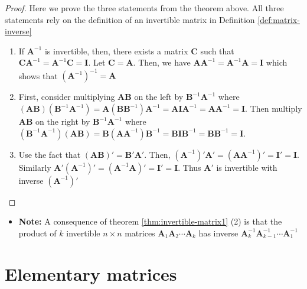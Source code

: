 \documentclass[
]{book}
\providecommand{\tightlist}{%
  \setlength{\itemsep}{0pt}\setlength{\parskip}{0pt}}
\theoremstyle{definition}
\theoremstyle{definition}
\theoremstyle{definition}
\theoremstyle{definition}
\theoremstyle{remark}
\begin{document}
\begin{proof}

Here we prove the three statements from the theorem above. All three statements rely on the definition of an invertible matrix in Definition \ref{def:matrix-inverse}

\begin{enumerate}
\def\labelenumi{\arabic{enumi})}
\item
  If \(\mathbf{A}^{-1}\) is invertible, then, there exists a matrix \(\mathbf{C}\) such that \(\mathbf{C} \mathbf{A}^{-1} = \mathbf{A}^{-1} \mathbf{C} = \mathbf{I}\). Let \(\mathbf{C} = \mathbf{A}\). Then, we have \(\mathbf{A} \mathbf{A}^{-1} = \mathbf{A}^{-1} \mathbf{A} = \mathbf{I}\) which shows that \(\left(\mathbf{A}^{-1}\right)^{-1} = \mathbf{A}\)
\item
  First, consider multiplying \(\mathbf{A}\mathbf{B}\) on the left by \(\mathbf{B}^{-1} \mathbf{A}^{-1}\) where \((\mathbf{A}\mathbf{B}) (\mathbf{B}^{-1} \mathbf{A}^{-1}) = \mathbf{A} (\mathbf{B} \mathbf{B}^{-1}) \mathbf{A}^{-1} = \mathbf{A} \mathbf{I} \mathbf{A}^{-1} = \mathbf{A} \mathbf{A}^{-1} = \mathbf{I}\). Then multiply \(\mathbf{A}\mathbf{B}\) on the right by \(\mathbf{B}^{-1} \mathbf{A}^{-1}\) where \((\mathbf{B}^{-1} \mathbf{A}^{-1}) (\mathbf{A}\mathbf{B}) = \mathbf{B} (\mathbf{A} \mathbf{A}^{-1}) \mathbf{B}^{-1} = \mathbf{B} \mathbf{I} \mathbf{B}^{-1} = \mathbf{B} \mathbf{B}^{-1} = \mathbf{I}\).
\item
  Use the fact that \((\mathbf{A} \mathbf{B})' = \mathbf{B}' \mathbf{A}'\). Then, \((\mathbf{A}^{-1})' \mathbf{A}' = (\mathbf{A}\mathbf{A}^{-1})' = \mathbf{I}' = \mathbf{I}\). Similarly \(\mathbf{A}'(\mathbf{A}^{-1})' = (\mathbf{A}^{-1}\mathbf{A})' = \mathbf{I}' = \mathbf{I}\). Thus \(\mathbf{A}'\) is invertible with inverse \((\mathbf{A}^{-1})'\)
\end{enumerate}

\end{proof}

\begin{itemize}
\tightlist
\item
  \textbf{Note:} A consequence of theorem \ref{thm:invertible-matrix1} (2) is that the product of \(k\) invertible \(n \times n\) matrices \(\mathbf{A}_1 \mathbf{A}_2 \cdots \mathbf{A}_k\) has inverse \(\mathbf{A}_k^{-1} \mathbf{A}_{k-1}^{-1} \cdots \mathbf{A}_1^{-1}\)
\end{itemize}

\hypertarget{elementary-matrices}{%
\section{Elementary matrices}\label{elementary-matrices}}
\end{document}
